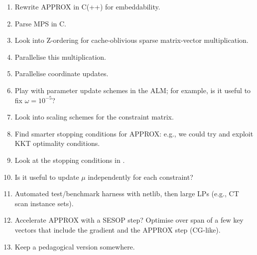 \documentclass{article}
\begin{document}
\begin{enumerate}
\item Rewrite APPROX in C(++) for embeddability.
\item Parse MPS in C.
\item Look into Z-ordering for cache-oblivious sparse matrix-vector
  multiplication.
\item Parallelise this multiplication.
\item Parallelise coordinate updates.
\item Play with parameter update schemes in the ALM; for example, is
  it useful to fix \(\omega=10^{-5}\)?
\item Look into scaling schemes for the constraint matrix.
\item Find smarter stopping conditions for APPROX: e.g., we could try
  and exploit KKT optimality conditions.
\item Look at the stopping conditions in \citep{Guler:1992tg}.
\item Is it useful to update \(\mu\) independently for each
  constraint?
\item Automated test/benchmark harness with netlib, then large LPs
  (e.g., CT scan instance sets).
\item Accelerate APPROX with a SESOP step? Optimise over span of a few
  key vectors that include the gradient and the APPROX step (CG-like).
\item Keep a pedagogical version somewhere.
\end{enumerate}



\end{document}
